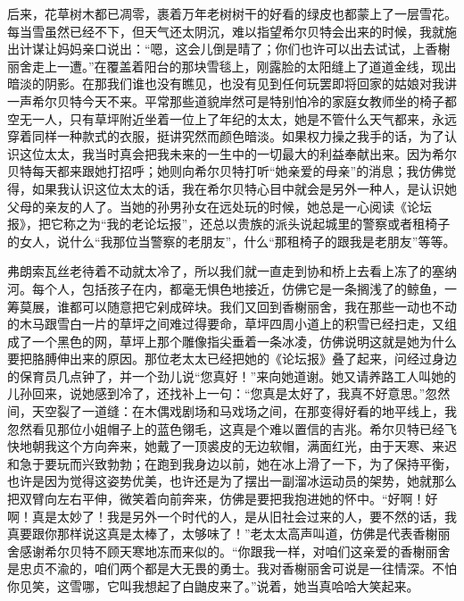 \par 后来，花草树木都已凋零，裹着万年老树树干的好看的绿皮也都蒙上了一层雪花。每当雪虽然已经不下，但天气还太阴沉，难以指望希尔贝特会出来的时候，我就施出计谋让妈妈亲口说出：“嗯，这会儿倒是晴了；你们也许可以出去试试，上香榭丽舍走上一遭。”在覆盖着阳台的那块雪毯上，刚露脸的太阳缝上了道道金线，现出暗淡的阴影。在那我们谁也没有瞧见，也没有见到任何玩罢即将回家的姑娘对我讲一声希尔贝特今天不来。平常那些道貌岸然可是特别怕冷的家庭女教师坐的椅子都空无一人，只有草坪附近坐着一位上了年纪的太太，她是不管什么天气都来，永远穿着同样一种款式的衣服，挺讲究然而颜色暗淡。如果权力操之我手的话，为了认识这位太太，我当时真会把我未来的一生中的一切最大的利益奉献出来。因为希尔贝特每天都来跟她打招呼；她则向希尔贝特打听“她亲爱的母亲”的消息；我仿佛觉得，如果我认识这位太太的话，我在希尔贝特心目中就会是另外一种人，是认识她父母的亲友的人了。当她的孙男孙女在远处玩的时候，她总是一心阅读《论坛报》，把它称之为“我的老论坛报”，还总以贵族的派头说起城里的警察或者租椅子的女人，说什么“我那位当警察的老朋友”，什么“那租椅子的跟我是老朋友”等等。
\par 弗朗索瓦丝老待着不动就太冷了，所以我们就一直走到协和桥上去看上冻了的塞纳河。每个人，包括孩子在内，都毫无惧色地接近，仿佛它是一条搁浅了的鲸鱼，一筹莫展，谁都可以随意把它剁成碎块。我们又回到香榭丽舍，我在那些一动也不动的木马跟雪白一片的草坪之间难过得要命，草坪四周小道上的积雪已经扫走，又组成了一个黑色的网，草坪上那个雕像指尖垂着一条冰凌，仿佛说明这就是她为什么要把胳膊伸出来的原因。那位老太太已经把她的《论坛报》叠了起来，问经过身边的保育员几点钟了，并一个劲儿说“您真好！”来向她道谢。她又请养路工人叫她的儿孙回来，说她感到冷了，还找补上一句：“您真是太好了，我真不好意思。”忽然间，天空裂了一道缝：在木偶戏剧场和马戏场之间，在那变得好看的地平线上，我忽然看见那位小姐帽子上的蓝色翎毛，这真是个难以置信的吉兆。希尔贝特已经飞快地朝我这个方向奔来，她戴了一顶裘皮的无边软帽，满面红光，由于天寒、来迟和急于要玩而兴致勃勃；在跑到我身边以前，她在冰上滑了一下，为了保持平衡，也许是因为觉得这姿势优美，也许还是为了摆出一副溜冰运动员的架势，她就那么把双臂向左右平伸，微笑着向前奔来，仿佛是要把我抱进她的怀中。“好啊！好啊！真是太妙了！我是另外一个时代的人，是从旧社会过来的人，要不然的话，我真要跟你那样说这真是太棒了，太够味了！”老太太高声叫道，仿佛是代表香榭丽舍感谢希尔贝特不顾天寒地冻而来似的。“你跟我一样，对咱们这亲爱的香榭丽舍是忠贞不渝的，咱们两个都是大无畏的勇士。我对香榭丽舍可说是一往情深。不怕你见笑，这雪哪，它叫我想起了白鼬皮来了。”说着，她当真哈哈大笑起来。

